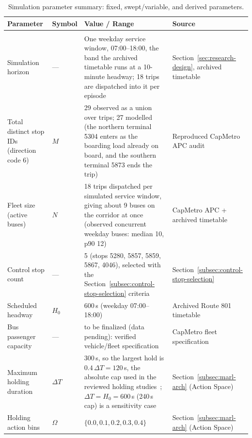 \begin{table}[htbp]
\centering
\caption{Simulation parameter summary: fixed, swept/variable, and derived parameters.}
\label{tab:sim-parameters}
\small
\renewcommand{\arraystretch}{1.25}

\begin{tabularx}{\textwidth}{
>{\RaggedRight\arraybackslash}p{}
>{\RaggedRight\arraybackslash}p{}
X
>{\RaggedRight\arraybackslash}p{}
}

\toprule
\textbf{Parameter} & \textbf{Symbol} & \textbf{Value / Range} & \textbf{Source} \\
\midrule
\multicolumn{4}{l}{\textit{Fixed simulation parameters}} \\
\midrule

Simulation horizon & --- & One weekday service window, 07:00--18:00, the band the archived timetable runs at a 10-minute headway; 18 trips are dispatched into it per episode & Section~\ref{sec:research-design}, archived timetable~\cite{CapMetro2021Timetable801} \\
Total distinct stop IDs (direction code 6) & $M$ & 29 observed as a union over trips; 27 modelled (the northern terminal 5304 enters as the boarding load already on board, and the southern terminal 5873 ends the trip) & Reproduced CapMetro APC audit \\
Fleet size (active buses) & $N$ & 18 trips dispatched per simulated service window, giving about 9 buses on the corridor at once (observed concurrent weekday buses: median 10, p90 12) & CapMetro APC + archived timetable \\
Control stop count & --- & 5 (stops 5280, 5857, 5859, 5867, 4046), selected with the Section~\ref{subsec:control-stop-selection} criteria & Section~\ref{subsec:control-stop-selection} \\
Scheduled headway & $H_0$ & 600\,s (weekday 07:00--18:00) & Archived Route 801 timetable~\cite{CapMetro2021Timetable801} \\
Bus passenger capacity & --- & to be finalized (data pending): verified vehicle/fleet specification & CapMetro fleet specification \\
Maximum holding duration & $\Delta T$ & 300\,s, so the largest hold is $0.4\,\Delta T = 120$\,s, the absolute cap used in the reviewed holding studies~\cite{Rodriguez2023Cooperative,Tang2024Curriculum}; $\Delta T = H_0 = 600$\,s (240\,s cap) is a sensitivity case & Section~\ref{subsec:marl-arch} (Action Space) \\
Holding action bins & $\Omega$ & $\{0.0, 0.1, 0.2, 0.3, 0.4\}$ & Section~\ref{subsec:marl-arch} (Action Space) \\

\end{tabularx}
\end{table}
